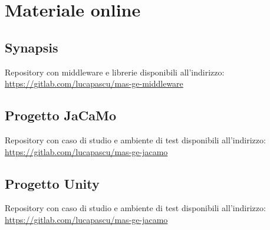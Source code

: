 \chapter*{Materiale online} \label{materiale_online}
\section*{Synapsis}
Repository con middleware e librerie disponibili all'indirizzo:\\
\href{https://gitlab.com/lucapascu/mas-ge-middleware}{https://gitlab.com/lucapascu/mas-ge-middleware}

\medskip

\section*{Progetto JaCaMo}
Repository con caso di studio e ambiente di test disponibili all'indirizzo:\\
\href{https://gitlab.com/lucapascu/mas-ge-jacamo}{https://gitlab.com/lucapascu/mas-ge-jacamo}

\medskip

\section*{Progetto Unity}
Repository con caso di studio e ambiente di test disponibili all'indirizzo:\\
\href{https://gitlab.com/lucapascu/mas-ge-jacamo}{https://gitlab.com/lucapascu/mas-ge-jacamo}
